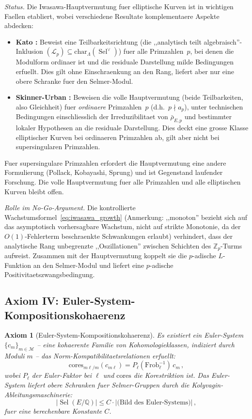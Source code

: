 \documentclass[aps,prd,twocolumn,superscriptaddress,nofootinbib]{revtex4-2}
\newtheorem{axiom}[theorem]{Axiom}
\theoremstyle{definition}
\theoremstyle{remark}
\DeclareMathOperator{\Sel}{Sel}
\begin{document}
\textit{Status.} Die Iwasawa-Hauptvermutung fuer elliptische Kurven ist in wichtigen Faellen etabliert, wobei verschiedene Resultate komplementaere Aspekte abdecken:
\begin{itemize}
\item \textbf{Kato \cite{Kato2004}:} Beweist eine Teilbarkeitsrichtung (die ,,analytisch teilt algebraisch''-Inklusion $(\mathcal{L}_p) \subseteq \mathrm{char}_\Lambda(\Sel^\vee)$) fuer alle Primzahlen~$p$, bei denen die Modulform ordinaer ist und die residuale Darstellung milde Bedingungen erfuellt. Dies gilt ohne Einschraenkung an den Rang, liefert aber nur eine obere Schranke fuer den Selmer-Modul.
\item \textbf{Skinner-Urban \cite{SkinnerUrban2014}:} Beweisen die volle Hauptvermutung (beide Teilbarkeiten, also Gleichheit) fuer \textit{ordinaere} Primzahlen~$p$ (d.h.\ $p \nmid a_p$), unter technischen Bedingungen einschliesslich der Irreduzibilitaet von $\bar{\rho}_{E,p}$ und bestimmter lokaler Hypothesen an die residuale Darstellung. Dies deckt eine grosse Klasse elliptischer Kurven bei ordinaeren Primzahlen ab, gilt aber nicht bei supersingularen Primzahlen.
\end{itemize}
Fuer supersingulare Primzahlen erfordert die Hauptvermutung eine andere Formulierung (Pollack, Kobayashi, Sprung) und ist Gegenstand laufender Forschung. Die volle Hauptvermutung fuer alle Primzahlen und alle elliptischen Kurven bleibt offen.

\textit{Rolle im No-Go-Argument.} Die kontrollierte Wachstumsformel~\eqref{eq:iwasawa_growth} (Anmerkung: ,,monoton'' bezieht sich auf das asymptotisch vorhersagbare Wachstum, nicht auf strikte Monotonie, da der $O(1)$-Fehlerterm beschraenkte Schwankungen erlaubt) verhindert, dass der analytische Rang unbegrenzte ,,Oszillationen'' zwischen Schichten des $\mathbb{Z}_p$-Turms aufweist. Zusammen mit der Hauptvermutung koppelt sie die $p$-adische $L$-Funktion an den Selmer-Modul und liefert eine $p$-adische Positivitaetszwangsbedingung.

\subsection{Axiom IV: Euler-System-Kompositionskohaerenz}

\begin{axiom}[Euler-System-Kompositionskohaerenz]
\label{ax:euler}
Es existiert ein Euler-System $\{c_m\}_{m \in \mathcal{M}}$ -- eine kohaerente Familie von Kohomologieklassen, indiziert durch Moduli $m$ -- das Norm-Kompatibilitaetsrelationen erfuellt:
\begin{equation}
\mathrm{cores}_{m\ell/m}(c_{m\ell}) = P_\ell(\mathrm{Frob}_\ell^{-1})\, c_m\,,
\label{eq:euler_norm}
\end{equation}
wobei $P_\ell$ der Euler-Faktor bei $\ell$ und $\mathrm{cores}$ die Korestriktion ist. Das Euler-System liefert obere Schranken fuer Selmer-Gruppen durch die Kolyvagin-Ableitungsmaschinerie:
\begin{equation}
|\Sel(E/\mathbb{Q})| \leq C \cdot |\text{(Bild des Euler-Systems)}|\,,
\end{equation}
fuer eine berechenbare Konstante $C$.
\end{axiom}
\end{document}
